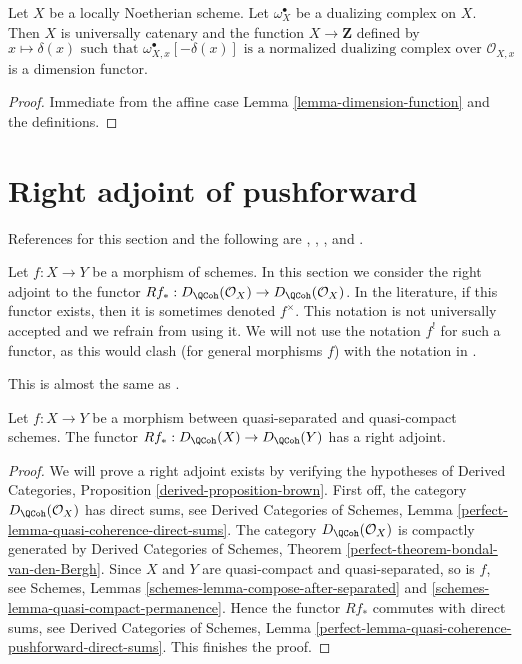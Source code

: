 \begin{lemma}
\label{lemma-dimension-function-scheme}
Let $X$ be a locally Noetherian scheme. Let $\omega_X^\bullet$
be a dualizing complex on $X$. Then $X$ is universally catenary
and the function
$X \to \mathbf{Z}$ defined by
$$
x \longmapsto \delta(x)\text{ such that }
\omega_{X, x}^\bullet[-\delta(x)]
\text{ is a normalized dualizing complex over }
\mathcal{O}_{X, x}
$$
is a dimension functor.
\end{lemma}

\begin{proof}
Immediate from the affine case
Lemma \ref{lemma-dimension-function}
and the definitions.
\end{proof}






\section{Right adjoint of pushforward}
\label{section-twisted-inverse-image}

\noindent
References for this section and the following are
\cite{Neeman-Grothendieck}, \cite{LN},
\cite{Lipman-notes}, and \cite{Neeman-improvement}.

\medskip\noindent
Let $f : X \to Y$ be a morphism of schemes.
In this section we consider the right adjoint to the functor
$Rf_* : D_\QCoh(\mathcal{O}_X) \to D_\QCoh(\mathcal{O}_X)$.
In the literature, if this functor exists, then it is sometimes
denoted $f^{\times}$. This notation is not universally accepted and we refrain
from using it. We will not use the notation $f^!$ for such a functor,
as this would clash (for general morphisms $f$) with the notation in
\cite{RD}.

\begin{lemma}
\label{lemma-twisted-inverse-image}
\begin{reference}
This is almost the same as \cite[Example 4.2]{Neeman-Grothendieck}.
\end{reference}
Let $f : X \to Y$ be a morphism between quasi-separated and quasi-compact
schemes. The functor $Rf_* : D_\QCoh(X) \to D_\QCoh(Y)$ has a
right adjoint.
\end{lemma}

\begin{proof}
We will prove a right adjoint exists by verifying the hypotheses of
Derived Categories, Proposition \ref{derived-proposition-brown}.
First off, the category $D_\QCoh(\mathcal{O}_X)$ has direct sums, see
Derived Categories of Schemes, Lemma
\ref{perfect-lemma-quasi-coherence-direct-sums}.
The category $D_\QCoh(\mathcal{O}_X)$ is compactly generated by
Derived Categories of Schemes, Theorem
\ref{perfect-theorem-bondal-van-den-Bergh}.
Since $X$ and $Y$ are quasi-compact and quasi-separated, so is $f$, see
Schemes, Lemmas \ref{schemes-lemma-compose-after-separated} and
\ref{schemes-lemma-quasi-compact-permanence}.
Hence the functor $Rf_*$ commutes with direct sums, see
Derived Categories of Schemes, Lemma
\ref{perfect-lemma-quasi-coherence-pushforward-direct-sums}.
This finishes the proof.
\end{proof}

